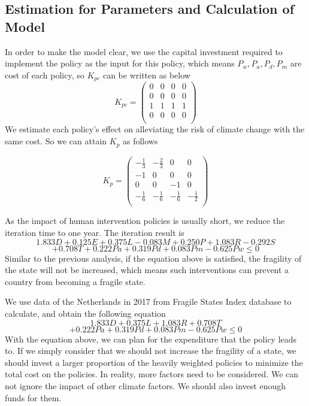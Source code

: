 \documentclass{mcmthesis}
\begin{document}
	\subsection{Estimation for Parameters and Calculation of Model}
	In order to make the model clear, we use the capital investment required to implement the policy as the input for this policy, which means $P_w, P_a, P_d, P_m$ are cost of each policy, so $K_{pc}$ can be written as below
	$$
	K_{pc} = 
	\left(
	\begin{matrix}
		0 & 0 & 0 & 0 \\
		0 & 0 & 0 & 0 \\
		1 & 1 & 1 & 1 \\
		0 & 0 & 0 & 0 \\
	\end{matrix}
	\right)
	$$
	We estimate each policy's effect on alleviating the risk of climate change with the same cost. So we can attain $K_p$ as follows
	\begin{spacing}{1.5}
		$$
		K_{p}=
		\left(
		\begin{matrix}
		-\frac{1}{3} & -\frac{2}{3} & 0 & 0 \\
		-1 & 0 & 0 & 0 \\
		0 & 0 & -1 & 0 \\
		-\frac{1}{6} & -\frac{1}{6} & -\frac{1}{6} & -\frac{1}{2} \\
		\end{matrix}
		\right)
		$$
	\end{spacing}
	As the impact of human intervention policies is usually short, we reduce the iteration time to one year. The iteration result is
	$$
	1.833D + 0.125E + 0.375L - 0.083M + 0.250P + 1.083R - 0.292S 
	$$
	$$
	 + 0.708T + 0.222Pa + 0.319Pd + 0.083Pm - 0.625Pw \leq 0
	$$
	Similar to the previous analysis, if the equation above is satisfied, the fragility of the state will not be increased, which means such interventions can prevent a country from becoming a fragile state.
	
	We use data of the Netherlands in 2017 from Fragile States Index database to calculate, and obtain the following equation
	$$
	1.833D + 0.375L + 1.083R + 0.708T
	$$
	$$
	 + 0.222Pa + 0.319Pd + 0.083Pm - 0.625Pw \leq 0
	$$
	With the equation above, we can plan for the expenditure that the policy leads to. If we simply consider that we should not increase the fragility of a state, we should invest a larger proportion of the heavily weighted policies to minimize the total cost on the policies. In reality, more factors need to be considered. We can not ignore the impact of other climate factors. We should also invest enough funds for them.
	
\end{document}
